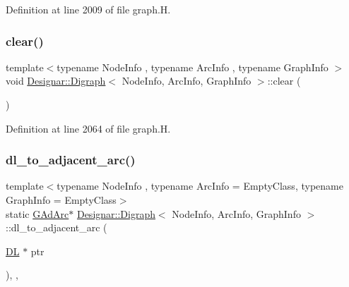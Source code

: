 Definition at line 2009 of file graph.\+H.

\mbox{\label{class_designar_1_1_digraph_a1ec067a8df6129b27e4d79c9c2755899}} 
\subsubsection{\texorpdfstring{clear()}{clear()}}
{\footnotesize\ttfamily template$<$typename Node\+Info , typename Arc\+Info , typename Graph\+Info $>$ \\
void \hyperlink{class_designar_1_1_digraph}{Designar\+::\+Digraph}$<$ Node\+Info, Arc\+Info, Graph\+Info $>$\+::clear (\begin{DoxyParamCaption}{ }\end{DoxyParamCaption})}



Definition at line 2064 of file graph.\+H.

\mbox{\label{class_designar_1_1_digraph_afe3162bf2e56b177e7ee1a938ae2af8b}} 
\subsubsection{\texorpdfstring{dl\+\_\+to\+\_\+adjacent\+\_\+arc()}{dl\_to\_adjacent\_arc()}}
{\footnotesize\ttfamily template$<$typename Node\+Info , typename Arc\+Info  = Empty\+Class, typename Graph\+Info  = Empty\+Class$>$ \\
static \hyperlink{class_designar_1_1_digraph_a0c6d846f23d1e82556fb6055557df53f}{G\+Ad\+Arc}$\ast$ \hyperlink{class_designar_1_1_digraph}{Designar\+::\+Digraph}$<$ Node\+Info, Arc\+Info, Graph\+Info $>$\+::dl\+\_\+to\+\_\+adjacent\+\_\+arc (\begin{DoxyParamCaption}\item[{\hyperlink{class_designar_1_1_d_l}{DL} $\ast$}]{ptr }\end{DoxyParamCaption})\hspace{0.3cm}{\ttfamily [inline]}, {\ttfamily [static]}, {\ttfamily [protected]}}



